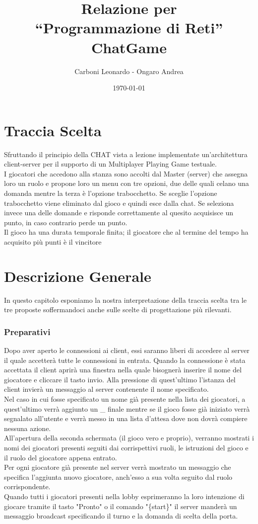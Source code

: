 \documentclass[a4paper,12pt]{report}
\title{Relazione per \\``Programmazione di Reti'' \\ ChatGame}
\author{Carboni Leonardo - Ongaro Andrea}
\date{\today}
\begin{document}
\maketitle

\tableofcontents
\thispagestyle{fancy}

\chapter{Traccia Scelta}
Sfruttando il principio della CHAT vista a lezione implementate un’architettura client-server per il supporto di un Multiplayer Playing Game testuale. \\
I giocatori che accedono alla stanza sono accolti dal Master (server) che assegna loro un ruolo e propone loro un menu con tre opzioni, due delle quali celano una domanda mentre la terza è l’opzione trabocchetto. Se sceglie l’opzione trabocchetto viene eliminato dal gioco e quindi esce dalla chat.
Se seleziona invece una delle domande e risponde correttamente al quesito acquisisce un punto, in caso contrario perde un punto.\\
Il gioco ha una durata temporale finita; il giocatore che al termine del tempo ha acquisito più punti è il vincitore

\chapter{Descrizione Generale}
In questo capitolo esponiamo la nostra interpretazione della traccia scelta tra le tre proposte soffermandoci anche sulle scelte di progettazione più rilevanti.

\subsection{Preparativi}
Dopo aver aperto le connessioni ai client, essi saranno liberi di accedere al server il quale accetterà tutte le connessioni in entrata. Quando la connessione è stata accettata il client aprirà una finestra nella quale bisognerà inserire il nome del giocatore e cliccare il tasto invio. Alla pressione di quest'ultimo l'istanza del client invierà un messaggio al server contenente il nome specificato. \\
Nel caso in cui fosse specificato un nome già presente nella lista dei giocatori, a quest'ultimo verrà aggiunto un \_ finale mentre se il gioco fosse già iniziato verrà segnalato all'utente e verrà messo in una lista d'attesa dove non dovrà compiere nessuna azione.\\
All'apertura della seconda schermata (il gioco vero e proprio), verranno mostrati i nomi dei giocatori presenti seguiti dai corrispettivi ruoli, le istruzioni del gioco e il ruolo del giocatore appena entrato.\\
Per ogni giocatore già presente nel server verrà mostrato un messaggio che specifica l'aggiunta nuovo giocatore, anch'esso a sua volta seguito dal ruolo corrispondente. \\
Quando tutti i giocatori presenti nella lobby esprimeranno la loro intenzione di giocare tramite il tasto "Pronto" o il comando "\{start\}"
il server manderà un messaggio broadcast specificando il turno e la domanda di scelta della porta.\clearpage
\end{document}
